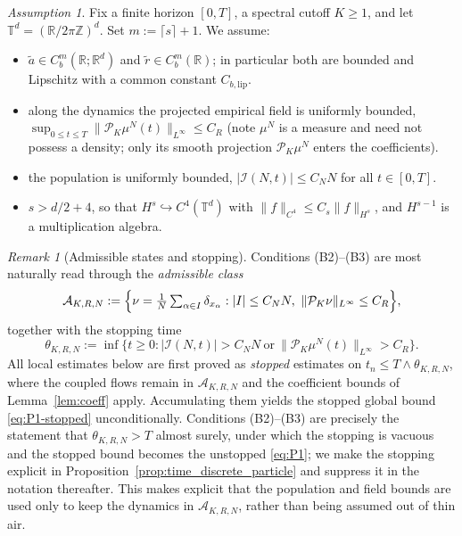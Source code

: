 \documentclass[a4paper,fleqn]{cas-sc}
\theoremstyle{definition}
\theoremstyle{remark}
\newtheorem{remark}[theorem]{Remark}
\newtheorem{assumption}{Assumption}
\begin{document}
\begin{assumption}\label{ass:time}
Fix a finite horizon $[0,T]$, a spectral cutoff $K\ge1$, and let
$\mathbb T^d=(\mathbb R/2\pi\mathbb Z)^d$. Set $m:=\lceil s\rceil+1$. We assume:
\begin{itemize}
\item[(B1)] $\tilde a\in C^m_b(\mathbb R;\mathbb R^d)$ and $\tilde r\in C^m_b(\mathbb R)$;
in particular both are bounded and Lipschitz with a common constant
$C_{b,\mathrm{lip}}$.
\item[(B2)] along the dynamics the projected empirical field is uniformly bounded,
$\sup_{0\le t\le T}\|\mathcal P_K\mu^N(t)\|_{L^\infty}\le C_R$ (note $\mu^N$ is a
measure and need not possess a density; only its smooth projection
$\mathcal P_K\mu^N$ enters the coefficients).
\item[(B3)] the population is uniformly bounded, $|\mathcal I(N,t)|\le C_N N$ for all
$t\in[0,T]$.
\item[(B4)] $s>d/2+4$, so that $H^s\hookrightarrow C^4(\mathbb T^d)$ with
$\|f\|_{C^4}\le C_s\|f\|_{H^s}$, and $H^{s-1}$ is a multiplication algebra.
\end{itemize}
\end{assumption}

\begin{remark}[Admissible states and stopping]\label{rem:admissible}
Conditions (B2)--(B3) are most naturally read through the \emph{admissible class}
\[
\mathcal A_{K,R,N}:=\Bigl\{\nu=\tfrac1N\textstyle\sum_{\alpha\in I}\delta_{x_\alpha}:
|I|\le C_NN,\ \|\mathcal P_K\nu\|_{L^\infty}\le C_R\Bigr\},
\]
together with the stopping time
\[
\theta_{K,R,N}:=\inf\bigl\{t\ge0:|\mathcal I(N,t)|>C_NN\ \text{or}\
\|\mathcal P_K\mu^N(t)\|_{L^\infty}>C_R\bigr\}.
\]
All local estimates below are first proved as \emph{stopped} estimates on
$t_n\le T\wedge\theta_{K,R,N}$, where the coupled flows remain in
$\mathcal A_{K,R,N}$ and the coefficient bounds of Lemma~\ref{lem:coeff} apply.
Accumulating them yields the stopped global bound \eqref{eq:P1-stopped}
unconditionally. Conditions (B2)--(B3) are precisely the statement that
$\theta_{K,R,N}>T$ almost surely, under which the stopping is vacuous and the stopped
bound becomes the unstopped \eqref{eq:P1}; we make the stopping explicit in
Proposition~\ref{prop:time_discrete_particle} and suppress it in the notation
thereafter. This makes explicit that the population and field bounds are used only to
keep the dynamics in $\mathcal A_{K,R,N}$, rather than being assumed out of thin air.
\end{remark}
\end{document}
